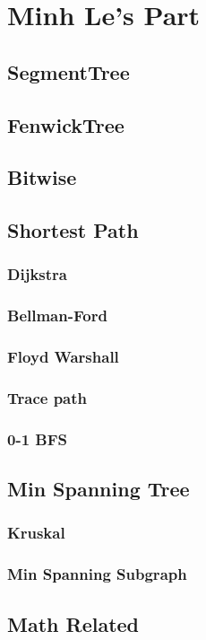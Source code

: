 \chapter{Minh Le's Part}

\section{SegmentTree}

\section{FenwickTree}

\section{Bitwise}
	
\section{Shortest Path}
	\subsection{Dijkstra}
	\subsection{Bellman-Ford}
	\subsection{Floyd Warshall}
	\subsection{Trace path}
	\subsection{0-1 BFS}

\section{Min Spanning Tree}
	\subsection{Kruskal}
	\subsection{Min Spanning Subgraph}
		


\section{Math Related}